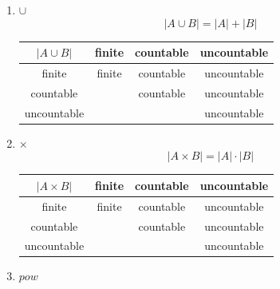 \documentclass[english,dvipdfmx]{jsarticle}
\begin{document}
\begin{description}
\begin{enumerate}
                \item $\cup$
                    \begin{equation*}
                        | A \cup B | = | A | + | B | 
                    \end{equation*}
                    \begin{table}[H]
                        \begin{center}
                        \begin{tabular}{|c|c|c|c|} \hline
                            $|A \cup B| $& finite & countable & uncountable \\ \hline
                            finite & finite &  countable & uncountable \\ \hline
                            countable &  & countable & uncountable \\ \hline
                            uncountable & & & uncountable \\ \hline
                        \end{tabular}
                    \end{center}
                    \end{table}
                \item $\times$
                    \begin{equation*}
                        | A \times B | = | A | \cdot | B | 
                    \end{equation*}
                    \begin{table}[H]
                        \begin{center}
                        \begin{tabular}{|c|c|c|c|} \hline
                            $|A \times B| $& finite & countable & uncountable \\ \hline
                            finite & finite &  countable & uncountable \\ \hline
                            countable &  & countable & uncountable \\ \hline
                            uncountable & & & uncountable \\ \hline
                        \end{tabular}
                    \end{center}
                    \end{table}
                \item $pow$
                    \begin{equation*}

\end{equation*}
\end{enumerate}
\end{description}
\end{document}
